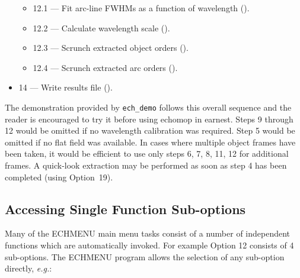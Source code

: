 \begin{itemize}
\begin{itemize}
   \item {12.1 --- Fit arc-line FWHMs as a function of wavelength
         ().}

   \item {12.2 --- Calculate wavelength scale
         ().}

   \item {12.3 --- Scrunch extracted object orders
         ().}

   \item {12.4 --- Scrunch extracted arc orders
         ().}

\end{itemize}

\item {14 --- Write results file
      ().}

\end{itemize}


The demonstration provided by \verb+ech_demo+ follows this overall sequence
and the reader is encouraged to try it before using {\sc echomop} in earnest.
 Steps 9 through 12 would be omitted if
no wavelength calibration was required.
Step 5 would be omitted if no flat field was
available.   In cases where multiple object
frames have been taken, it would be efficient to use only steps 6, 7, 8, 11,
12 for additional frames.
  A quick-look extraction may be performed as
soon as step 4 has been completed (using Option~19).


\subsection{Accessing Single Function Sub-options}

Many of the ECHMENU main menu tasks consist of a number of independent
functions which are automatically invoked. For example Option 12 consists
of 4 sub-options. The ECHMENU program allows the selection of any sub-option
directly, {\it{e.g.}}:

